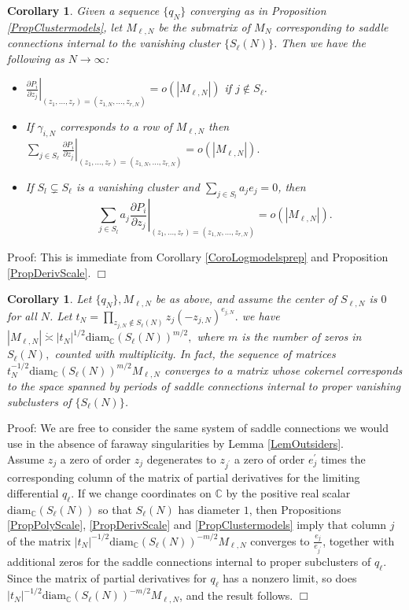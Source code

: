 \documentclass[12pt]{article}
\newtheorem{corollary}[theorem]{Corollary}
\newcommand{\cc}{\mathbb{C}}
\newcommand{\diam}{\mathrm{diam}}
\begin{document}
\begin{corollary}\label{CoroLogmodels} Given a sequence $\{q_N\}$ converging as in Proposition \ref{PropClustermodels}, let $M_{\ell,N}$ be the submatrix of $M_N$ corresponding to saddle connections internal to the vanishing cluster $\{S_\ell(N)\}$. Then we have the following as $N \to \infty$:
\begin{itemize}\item $\left. \frac{\partial P_{i}}{\partial z_j} \right|_{(z_1,...,z_r) = (z_{1,N},...,z_{r,N})} = o(|M_{\ell,N}|)$ if $j \notin S_\ell$.
\item If $\gamma_{i,N}$ corresponds to a row of $M_{\ell,N}$ then $\sum\limits_{j \in S_\ell} \left. \frac{\partial P_{i}}{\partial z_j} \right|_{(z_1,...,z_r) = (z_{1,N},...,z_{r,N})} = o(|M_{\ell,N}|).$
\item If $S_l \subsetneq S_\ell$ is a vanishing cluster and $\sum\limits_{j \in S_l} a_j e_j = 0$, then $$\sum_{j \in S_l} a_j \left. \frac{\partial P_{i}}{\partial z_j} \right|_{(z_1,...,z_r) = (z_{1,N},...,z_{r,N})} = o(|M_{\ell,N}|).$$\end{itemize}\end{corollary}

\noindent Proof: This is immediate from Corollary \ref{CoroLogmodelsprep} and Proposition \ref{PropDerivScale}. $\Box$

\begin{corollary}\label{CoroFirstOrderOnClusterMagnitude}Let $\{q_N\}, M_{\ell,N}$ be as above, and assume the center of $S_{\ell,N}$ is $0$ for all $N$. Let $t_N = \prod\limits_{z_{j,N} \notin S_\ell(N)} z_j (-z_{j,N})^{e_{j,N}}.$ we have $|M_{\ell,N}| \dot{\asymp} |t_N|^{1/2} \diam_\cc(S_\ell(N))^{m/2},$ where $m$ is the number of zeros in $S_\ell(N),$ counted with multiplicity. In fact, the sequence of matrices $t_N^{-1/2}\diam_\cc(S_\ell(N))^{m/2}M_{\ell,N}$ converges to a matrix whose cokernel corresponds to the space spanned by periods of saddle connections internal to proper vanishing subclusters of $\{S_\ell(N)\}$. \end{corollary}

\noindent Proof: We are free to consider the same system of saddle connections we would use in the absence of faraway singularities by Lemma \ref{LemOutsiders}.\\

\noindent Assume $z_j$ a zero of order $z_j$ degenerates to $z_{j^\prime}$ a zero of order $e_j^\prime$ times the corresponding column of the matrix of partial derivatives for the limiting differential $q_\ell$. If we change coordinates on $\cc$ by the positive real scalar $\diam_\cc(S_\ell(N))$ so that $S_\ell(N)$ has diameter $1$, then Propositions \ref{PropPolyScale}, \ref{PropDerivScale} and \ref{PropClustermodels} imply that column $j$ of the matrix $|t_N|^{-1/2}\diam_\cc(S_\ell(N))^{-m/2}M_{\ell,N}$ converges to $\frac{e_j}{e_{j^\prime}}$, together with additional zeros for the saddle connections internal to proper subclusters of $q_\ell$. Since the matrix of partial derivatives for $q_\ell$ has a nonzero limit, so does $|t_N|^{-1/2}\diam_\cc(S_\ell(N))^{-m/2}M_{\ell,N}$, and the result follows. $\Box$\\
\end{document}
